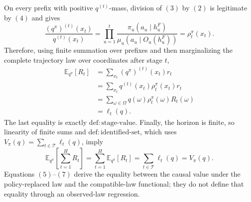 On every prefix with positive \(q^{(t)}\)-mass, division of \((3)\) by \((2)\)
is legitimate by \((4)\) and gives
\[
\frac{(q^\pi)^{(t)}(x_t)}{q^{(t)}(x_t)}
=\prod_{u=1}^t
\frac{\pi_u(a_u\mid h_u^F)}
{\mu_u(a_u\mid O_u(h_u^F))}
=\rho_t^\pi(x_t).
\tag{5}
\]
Therefore, using finite summation over prefixes and then marginalizing the
complete trajectory law over coordinates after stage \(t\),
\[
\begin{aligned}
\mathbb E_{q^\pi}[R_t]
&=\sum_{x_t}(q^\pi)^{(t)}(x_t)r_t \\
&=\sum_{x_t}q^{(t)}(x_t)\rho_t^\pi(x_t)r_t \\
&=\sum_{\omega\in\Omega}q(\omega)\rho_t^\pi(\omega)R_t(\omega) \\
&=\ell_t(q).
\end{aligned}
\tag{6}
\]
The last equality is exactly \(\mathrm{def{:}stage\text{-}value}\).  Finally,
the horizon is finite, so linearity of finite sums and
\(\mathrm{def{:}identified\text{-}set}\), which uses
\(V_\pi(q)=\sum_{t\in\mathcal T}\ell_t(q)\), imply
\[
\mathbb E_{q^\pi}\!\left[\sum_{t=1}^H R_t\right]
=\sum_{t=1}^H\mathbb E_{q^\pi}[R_t]
=\sum_{t\in\mathcal T}\ell_t(q)
=V_\pi(q).
\tag{7}
\]
Equations \((5)\)--\((7)\) derive the equality between the causal value under
the policy-replaced law and the compatible-law functional; they do not define
that equality through an observed-law regression.
